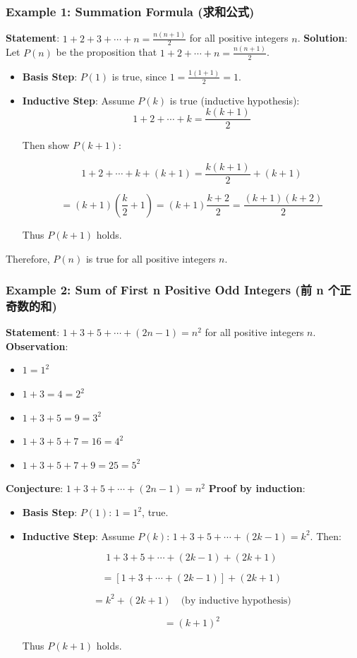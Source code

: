 \documentclass[10pt,a4paper,openany]{ctexbook}
\theoremstyle{definition}
\theoremstyle{remark}
\begin{document}
\subsubsection{Example 1: Summation Formula (求和公式)}

\textbf{Statement}: $\displaystyle 1 + 2 + 3 + \cdots + n = \frac{n(n+1)}{2}$ for all positive integers $n$.
\textbf{Solution}:
Let $P(n)$ be the proposition that $1 + 2 + \cdots + n = \frac{n(n+1)}{2}$.
\begin{itemize}
\item \textbf{Basis Step}: $P(1)$ is true, since $1 = \frac{1(1+1)}{2} = 1$.
\item \textbf{Inductive Step}: Assume $P(k)$ is true (inductive hypothesis):
\[
1 + 2 + \cdots + k = \frac{k(k+1)}{2}
\]

Then show $P(k+1)$:

\[
1 + 2 + \cdots + k + (k+1) = \frac{k(k+1)}{2} + (k+1)
\]

\[
= (k+1)\left(\frac{k}{2} + 1\right) = (k+1)\frac{k+2}{2} = \frac{(k+1)(k+2)}{2}
\]

Thus $P(k+1)$ holds.


\end{itemize}

Therefore, $P(n)$ is true for all positive integers $n$.
\vspace{-2pt}

\subsubsection{Example 2: Sum of First n Positive Odd Integers (前 n 个正奇数的和)}

\textbf{Statement}: $1 + 3 + 5 + \cdots + (2n-1) = n^2$ for all positive integers $n$.
\textbf{Observation}:
\begin{itemize}
\item $1 = 1^2$
\item $1+3 = 4 = 2^2$
\item $1+3+5 = 9 = 3^2$
\item $1+3+5+7 = 16 = 4^2$
\item $1+3+5+7+9 = 25 = 5^2$

\end{itemize}

\textbf{Conjecture}: $1 + 3 + 5 + \cdots + (2n-1) = n^2$
\textbf{Proof by induction}:
\begin{itemize}
\item \textbf{Basis Step}: $P(1)$: $1 = 1^2$, true.
\item \textbf{Inductive Step}: Assume $P(k)$: $1 + 3 + 5 + \cdots + (2k-1) = k^2$.
Then:

\[
1 + 3 + 5 + \cdots + (2k-1) + (2k+1)
\]

\[
= [1 + 3 + \cdots + (2k-1)] + (2k+1)
\]

\[
= k^2 + (2k+1) \quad \text{(by inductive hypothesis)}
\]

\[
= (k+1)^2
\]

Thus $P(k+1)$ holds.


\end{itemize}
\end{document}

